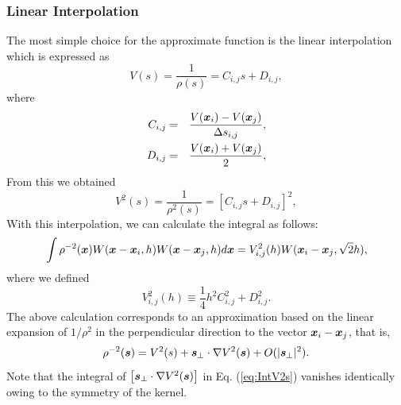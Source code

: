 \documentclass{cjour}
\newcommand{ \Vec   }[1]{ \mbox{\boldmath $ #1 $} }
\begin{document}
\begin{article}
\subsubsection{Linear Interpolation}
                                                     \label{Sec:Linear}
The most simple choice for the approximate function is the linear 
interpolation which is expressed as 
\begin{equation}
       V(s) =  \frac{1}{\rho(s)} = C_{i,j} s + D_{i,j} , 
                                                        \label{eq:VsL}
\end{equation}
where 
\begin{eqnarray}
 C_{i,j} & = & \frac{ V(\Vec{x}_i) - V(\Vec{x}_j) }
                    { \Delta s_{i,j}   }  , 
                                                            \nonumber \\
 D_{i,j} & = & \frac{ V(\Vec{x}_i) + V(\Vec{x}_j)}{2} , 
\end{eqnarray}
From this we obtained 
\begin{equation}
       V^2(s) =  \frac{1}{\rho^2(s)} = [ C_{i,j} s + D_{i,j} ]^2 , 
                                                        \label{eq:Vs2L}
\end{equation}
With this interpolation, we can calculate the integral 
as follows: 
\begin{equation}
     \int \rho^{-2}(\Vec{x})
             W(\Vec{x}-\Vec{x}_i, h)
             W(\Vec{x}-\Vec{x}_j, h) d\Vec{x} = 
          V_{i,j}^2 (h) W(\Vec{x}_i-\Vec{x}_j, \sqrt{2}h) ,
                                                    \label{eq:IntV2s} 
\end{equation}
where we defined 
\begin{equation} 
                     V_{i,j}^2 (h) \equiv
                     \frac{ 1}{4 } h^2 C_{i,j}^2 + D_{i,j}^2     . 
                                                    \label{eq:V2ijL} 
\end{equation}
The above calculation corresponds to an approximation based on 
the linear expansion of $1/\rho^2$ in the perpendicular direction 
to the vector $\Vec{x}_i-\Vec{x}_j$, that is,  
\begin{equation} 
       \rho^{-2}(\Vec{s}) =        V^2(s)
                            + \Vec{s}_{\perp} \cdot \nabla V^2(\Vec{s})
                            + O(|\Vec{s}_{\perp}|^2) . 
\end{equation}
Note that 
the integral of 
$\left[ \Vec{s}_{\perp} \cdot \nabla V^2(\Vec{s}) \right]$ 
in Eq. (\ref{eq:IntV2s}) vanishes identically 
owing to the symmetry of the kernel.  


\end{article}
\end{document}
